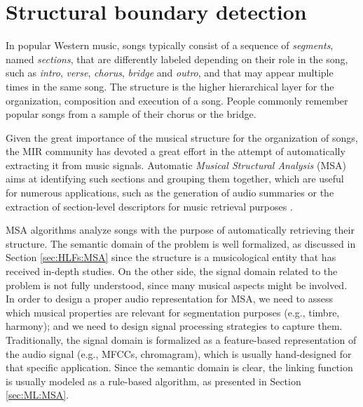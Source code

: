 \chapter{Structural boundary detection}
\label{Chap:MSA}
In popular Western music, songs typically consist of a sequence of \textit{segments}, named \textit{sections}, that are differently labeled depending on their role in the song, such as \textit{intro}, \textit{verse}, \textit{chorus}, \textit{bridge} and \textit{outro}, and that may appear multiple times in the same song. The structure is the higher hierarchical layer for the organization, composition and execution of a song. People commonly remember popular songs from a sample of their chorus or the bridge.%

Given the great importance of the musical structure for the organization of songs, the MIR community has devoted a great effort in the attempt of automatically extracting it from music signals. Automatic \textit{Musical Structural Analysis} (MSA) aims at identifying such sections and grouping them together, which are useful for numerous applications, such as the generation of audio summaries \cite{peeters2002toward} or the extraction of section-level descriptors for music retrieval purposes \cite{buccoli2015dimensional,chiarandini2011}.

MSA algorithms analyze songs with the purpose of automatically retrieving their structure. The semantic domain of the problem is well formalized, as discussed in Section \ref{sec:HLFs:MSA} since the structure is a musicological entity that has received in-depth studies. On the other side, the signal domain related to the problem is not fully understood, since many musical aspects might be involved. In order to design a proper audio representation for MSA, we need to assess which musical properties are relevant for segmentation purposes (e.g., timbre, harmony); and we need to design signal processing strategies to capture them. Traditionally, the signal domain is formalized as a feature-based representation of the audio signal (e.g., MFCCs, chromagram), which is usually hand-designed for that specific application. Since the semantic domain is clear, the linking function is usually modeled as a rule-based algorithm, as presented in Section \ref{sec:ML:MSA}.

